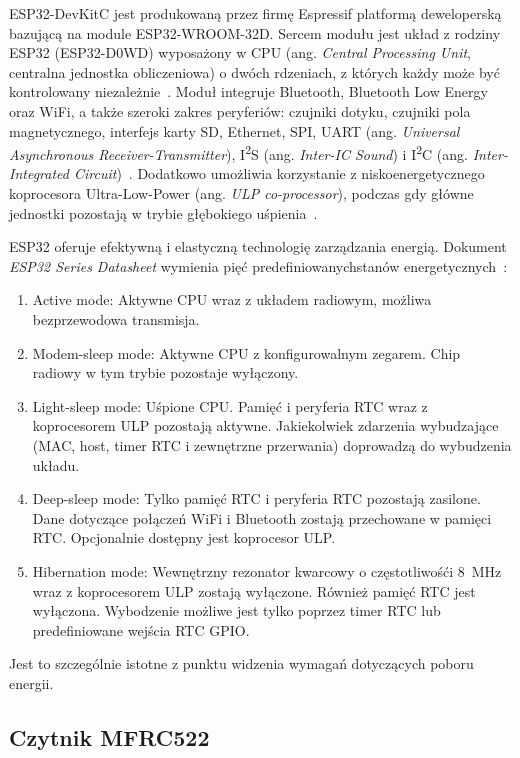             ESP32-DevKitC jest produkowaną przez firmę Espressif platformą deweloperską bazującą na module ESP32-WROOM-32D. Sercem modułu jest układ z rodziny ESP32 (ESP32-D0WD) wyposażony w CPU (ang. \textit{Central Processing Unit}, centralna jednostka obliczeniowa) o dwóch rdzeniach, z których każdy może być kontrolowany niezależnie~\cite{esp32-wroom32-ds}. Moduł integruje Bluetooth, Bluetooth Low Energy oraz WiFi, a także szeroki zakres peryferiów: czujniki dotyku, czujniki pola magnetycznego, interfejs karty SD, Ethernet, SPI, UART (ang. \textit{Universal Asynchronous Receiver-Transmitter}), I\textsuperscript{2}S (ang. \textit{Inter-IC Sound}) i I\textsuperscript{2}C (ang. \textit{Inter-Integrated Circuit})~\cite{esp32-wroom32-ds}. Dodatkowo umożliwia korzystanie z niskoenergetycznego koprocesora Ultra-Low-Power (ang. \textit{ULP co-processor}), podczas gdy główne jednostki pozostają w trybie głębokiego uśpienia~\cite{esp32-tech-ref-man}.

            ESP32 oferuje efektywną i elastyczną technologię zarządzania energią. Dokument \textit{ESP32 Series Datasheet} wymienia pięć predefiniowanychstanów energetycznych~\cite{esp32-ds}:
            \begin{enumerate}
                \item Active mode: Aktywne CPU wraz z układem radiowym, możliwa bezprzewodowa transmisja.
                \item Modem-sleep mode: Aktywne CPU z konfigurowalnym zegarem. Chip radiowy w tym trybie pozostaje wyłączony.
                \item Light-sleep mode: Uśpione CPU. Pamięć i peryferia RTC wraz z koprocesorem ULP pozostają aktywne. Jakiekolwiek zdarzenia wybudzające (MAC, host, timer RTC i zewnętrzne przerwania) doprowadzą do wybudzenia układu.
                \item Deep-sleep mode: Tylko pamięć RTC i peryferia RTC pozostają zasilone. Dane dotyczące połączeń WiFi i Bluetooth zostają przechowane w pamięci RTC. Opcjonalnie dostępny jest koprocesor ULP.
                \item Hibernation mode: Wewnętrzny rezonator kwarcowy o częstotliwośći 8~MHz wraz z koprocesorem ULP zostają wyłączone. Również pamięć RTC jest wyłączona. Wybodzenie możliwe jest tylko poprzez timer RTC lub predefiniowane wejścia RTC GPIO.
            \end{enumerate}
            Jest to szczególnie istotne z punktu widzenia wymagań dotyczących poboru energii.

        \subsection{Czytnik MFRC522}

